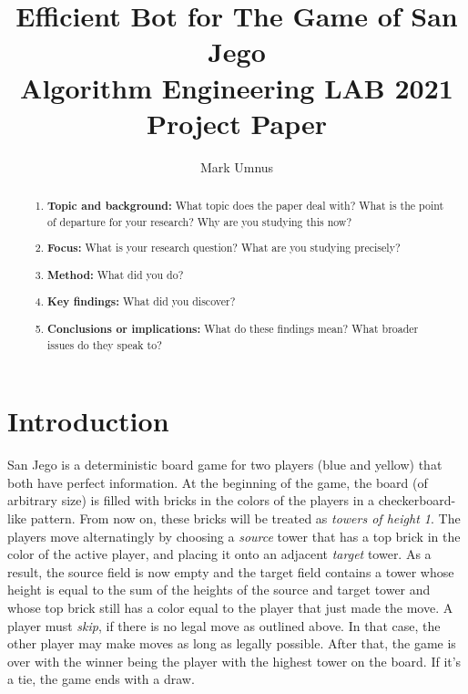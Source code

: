 \documentclass[sigconf]{acmart}
\begin{document}
\title[San Jego]{Efficient Bot for The Game of San Jego\\\large Algorithm Engineering LAB 2021 Project Paper}

\author{Mark Umnus}

\begin{abstract}

\begin{enumerate}
\item \textbf{Topic and background:} What topic does the paper deal with? What is the point of departure for your research? Why are you studying this now?
\item \textbf{Focus:} What is your research question? What are you studying precisely?
\item \textbf{Method:} What did you do?
\item \textbf{Key findings:} What did you discover?
\item \textbf{Conclusions or implications:} What do these findings mean? What broader issues do they speak to?
\end{enumerate}


\end{abstract}


\maketitle

\let\thefootnote\relax{}


\section{Introduction}

San Jego is a deterministic board game for two players (blue and yellow) that both have perfect information.
At the beginning of the game, the board (of arbitrary size) is filled with bricks in the colors of the players in a checkerboard-like pattern.
From now on, these bricks will be treated as \emph{towers of height 1}.
The players move alternatingly by choosing a \emph{source} tower that has a top brick in the color of the active player, and placing it onto an adjacent \emph{target} tower.
As a result, the source field is now empty and the target field contains a tower whose height is equal to the sum of the heights of the source and target tower and whose top brick still has a color equal to the player that just made the move.
A player must \emph{skip}, if there is no legal move as outlined above.
In that case, the other player may make moves as long as legally possible.
After that, the game is over with the winner being the player with the highest tower on the board.
If it's a tie, the game ends with a draw.
\end{document}
